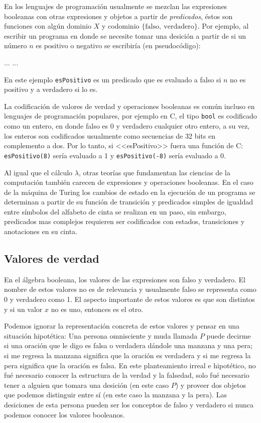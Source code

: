 En los lenguajes de programación usualmente se mezclan las expresiones booleanas con otras expresiones y objetos a partir de \emph{predicados}, éstos son funciones con algún dominio \( X \) y codominio \( \{ \mathrm{falso},\ \mathrm{verdadero} \} \). Por ejemplo, al escribir un programa en donde se necesite tomar una desición a partir de si un número \( n \) es positivo o negativo se escribiría (en pseudocódigo):

\begin{algorithmic}
  \STATE \( ... \)
  \ELSE
  \STATE \( ... \)
  \ENDIF
\end{algorithmic}

En este ejemplo \texttt{esPositivo} es un predicado que es evaluado a falso si \( n \) no es positivo y a verdadero si lo es.

La codificación de valores de verdad y operaciones booleanas es común incluso en lenguajes de programación populares, por ejemplo en C, el tipo \texttt{bool} es codificado como un entero, en donde falso es 0 y verdadero cualquier otro entero, a su vez, los enteros son codificados usualmente como secuencias de 32 bits en complemento a dos. Por lo tanto, si <<esPositivo>> fuera una función de C: \texttt{esPositivo(8)} sería evaluado a 1 y \texttt{esPositivo(-8)} sería evaluado a 0.

Al igual que el cálculo \( λ \), otras teorías que fundamentan las ciencias de la computación también carecen de expresiones y operaciones booleanas. En el caso de la máquina de Turing los cambios de estado en la ejecución de un programa se determinan a partir de su función de transición y predicados simples de igualdad entre símbolos del alfabeto de cinta se realizan en un paso, sin embargo, predicados mas complejos requieren ser codificados con estados, transiciones y anotaciones en su cinta.

\subsection{Valores de verdad}
\label{sec:valores-de-verdad}

En el álgebra booleana, los valores de las expresiones son falso y verdadero. El nombre de estos valores no es de relevancia y usualmente falso se representa como 0 y verdadero como 1. El aspecto importante de estos valores es que son distintos y si un valor \( x \) no es uno, entonces es el otro.

Podemos ignorar la representación concreta de estos valores y pensar en una situación hipotética: Una persona omnisciente y muda llamada \( P \) puede decirme si una oración que le digo es falsa o verdadera dándole una manzana y una pera; si me regresa la manzana significa que la oración es verdadera y si me regresa la pera significa que la oración es falsa. En este planteamiento irreal e hipotético, no fué necesario conocer la estructura de la verdad y la falsedad, solo fué necesario tener a alguien que tomara una desición (en este caso \( P \)) y proveer dos objetos que podemos distinguir entre sí (en este caso la manzana y la pera). Las desiciones de esta persona pueden ser los conceptos de falso y verdadero si nunca podemos conocer los valores booleanos.

